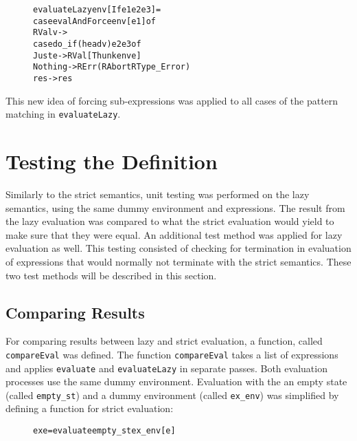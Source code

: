 \begin{figure}[H]
\begin{alltt}
  evaluateLazy env [If e1 e2 e3]   =
    case evalAndForce env [e1] of
      RVal v ->
        case do_if (head v) e2 e3 of
          Just e  -> RVal [Thunk env e]
          Nothing -> RErr (RAbort RType_Error)
      res -> res
\end{alltt}
\end{figure}

This new idea of forcing sub-expressions was applied to all cases of the
pattern matching in \texttt{evaluateLazy}.

\section{Testing the Definition}

Similarly to the strict semantics, unit testing was performed on the lazy
semantics, using the same dummy environment and expressions. 
The result from the lazy evaluation was compared to what the strict evaluation
would yield to make sure that they were equal. An additional test method was
applied for lazy evaluation as well. This testing consisted of checking for
termination in evaluation of expressions that would normally not terminate with
the strict semantics. These two test methods will be described in this section.

\subsection{Comparing Results}
\label{lazy:compres}
For comparing results between lazy and strict evaluation, a function, called
\texttt{compareEval} was defined. The function \texttt{compareEval} takes a list
of expressions and applies \texttt{evaluate} and \texttt{evaluateLazy}
in separate passes. Both evaluation processes use the same dummy environment.
Evaluation with the an empty state (called \texttt{empty\_st}) and
a dummy environment (called \texttt{ex\_env}) was simplified by defining a
function for strict evaluation:

\begin{figure}[H]
\begin{alltt}
  ex e = evaluate empty_st ex_env [e]
\end{alltt}
\end{figure}

